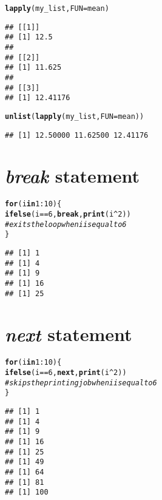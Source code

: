 \documentclass[11pt, a4paper]{article}\usepackage[]{graphicx}\usepackage[]{xcolor}
\makeatletter
\newcommand{\hlnum}[1]{\textcolor[rgb]{0.686,0.059,0.569}{#1}}%
\newcommand{\hlcom}[1]{\textcolor[rgb]{0.678,0.584,0.686}{\textit{#1}}}%
\newcommand{\hlopt}[1]{\textcolor[rgb]{0,0,0}{#1}}%
\newcommand{\hldef}[1]{\textcolor[rgb]{0.345,0.345,0.345}{#1}}%
\newcommand{\hlkwa}[1]{\textcolor[rgb]{0.161,0.373,0.58}{\textbf{#1}}}%
\newcommand{\hlkwc}[1]{\textcolor[rgb]{0.333,0.667,0.333}{#1}}%
\newcommand{\hlkwd}[1]{\textcolor[rgb]{0.737,0.353,0.396}{\textbf{#1}}}%
\newenvironment{kframe}{%
 \def\at@end@of@kframe{}%
 \ifinner\ifhmode%
  \def\at@end@of@kframe{\end{minipage}}%
  \begin{minipage}{\columnwidth}%
 \fi\fi%
 \def\FrameCommand##1{\hskip\@totalleftmargin \hskip-\fboxsep
 \colorbox{shadecolor}{##1}\hskip-\fboxsep
     \hskip-\linewidth \hskip-\@totalleftmargin \hskip\columnwidth}%
 \MakeFramed {\advance\hsize-\width
   \@totalleftmargin\z@ \linewidth\hsize
   \@setminipage}}%
 {\par\unskip\endMakeFramed%
 \at@end@of@kframe}
\newenvironment{knitrout}{}{} %
\makeatother
\begin{document}
\begin{knitrout}
\color{fgcolor}\begin{kframe}
\begin{alltt}
\hlkwd{lapply}\hldef{(my_list,} \hlkwc{FUN} \hldef{= mean)}
\end{alltt}
\begin{verbatim}
## [[1]]
## [1] 12.5
## 
## [[2]]
## [1] 11.625
## 
## [[3]]
## [1] 12.41176
\end{verbatim}
\begin{alltt}
\hlkwd{unlist}\hldef{(}\hlkwd{lapply}\hldef{(my_list,} \hlkwc{FUN} \hldef{= mean))}
\end{alltt}
\begin{verbatim}
## [1] 12.50000 11.62500 12.41176
\end{verbatim}
\end{kframe}
\end{knitrout}

\section{\textit{break} statement}

\begin{knitrout}
\color{fgcolor}\begin{kframe}
\begin{alltt}
\hlkwa{for} \hldef{(i} \hlkwa{in} \hlnum{1}\hlopt{:}\hlnum{10}\hldef{) \{}
    \hlkwd{ifelse}\hldef{(i} \hlopt{==} \hlnum{6}\hldef{,} \hlkwa{break}\hldef{,} \hlkwd{print}\hldef{(i}\hlopt{^}\hlnum{2}\hldef{))}
    \hlcom{# exits the loop when i is equal to 6}
\hldef{\}}
\end{alltt}
\begin{verbatim}
## [1] 1
## [1] 4
## [1] 9
## [1] 16
## [1] 25
\end{verbatim}
\end{kframe}
\end{knitrout}

\section{\textit{next} statement}

\begin{knitrout}
\color{fgcolor}\begin{kframe}
\begin{alltt}
\hlkwa{for} \hldef{(i} \hlkwa{in} \hlnum{1}\hlopt{:}\hlnum{10}\hldef{) \{}
    \hlkwd{ifelse}\hldef{(i} \hlopt{==} \hlnum{6}\hldef{,} \hlkwa{next}\hldef{,} \hlkwd{print}\hldef{(i}\hlopt{^}\hlnum{2}\hldef{))}
    \hlcom{# skips the printing job when i is equal to 6}
\hldef{\}}
\end{alltt}
\begin{verbatim}
## [1] 1
## [1] 4
## [1] 9
## [1] 16
## [1] 25
## [1] 49
## [1] 64
## [1] 81
## [1] 100
\end{verbatim}
\end{kframe}
\end{knitrout}
\end{document}

